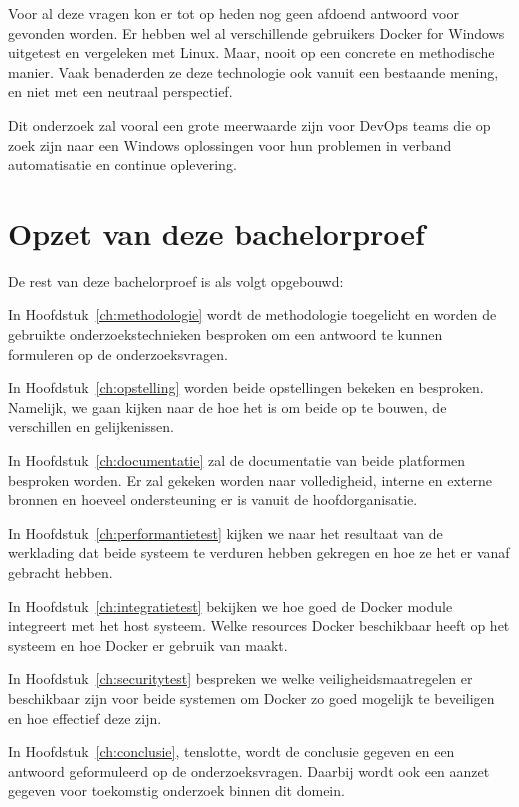 Voor al deze vragen kon er tot op heden nog geen afdoend antwoord voor gevonden worden. Er hebben wel al verschillende gebruikers Docker for Windows uitgetest en vergeleken met Linux. Maar, nooit op een concrete en methodische manier. Vaak benaderden ze deze technologie ook vanuit een bestaande mening, en niet met een neutraal perspectief.


Dit onderzoek zal vooral een grote meerwaarde zijn voor DevOps teams die op zoek zijn naar een Windows oplossingen voor hun problemen in verband automatisatie en continue oplevering.

\section{Opzet van deze bachelorproef}
\label{sec:opzet-bachelorproef}


De rest van deze bachelorproef is als volgt opgebouwd:

In Hoofdstuk~\ref{ch:methodologie} wordt de methodologie toegelicht en worden de gebruikte onderzoekstechnieken besproken om een antwoord te kunnen formuleren op de onderzoeksvragen.


In Hoofdstuk~\ref{ch:opstelling} worden beide opstellingen bekeken en besproken. Namelijk, we gaan kijken naar de hoe het is om beide op te bouwen, de verschillen en gelijkenissen.

In Hoofdstuk~\ref{ch:documentatie} zal de documentatie van beide platformen besproken worden. Er zal gekeken worden naar volledigheid, interne en externe bronnen en hoeveel ondersteuning er is vanuit de hoofdorganisatie.

In Hoofdstuk~\ref{ch:performantietest} kijken we naar het resultaat van de werklading dat beide systeem te verduren hebben gekregen en hoe ze het er vanaf gebracht hebben.

In Hoofdstuk~\ref{ch:integratietest} bekijken we hoe goed de Docker module integreert met het host systeem. Welke resources Docker beschikbaar heeft op het systeem en hoe Docker er gebruik van maakt.

In Hoofdstuk~\ref{ch:securitytest} bespreken we welke veiligheidsmaatregelen er beschikbaar zijn voor beide systemen om Docker zo goed mogelijk te beveiligen en hoe effectief deze zijn.

In Hoofdstuk~\ref{ch:conclusie}, tenslotte, wordt de conclusie gegeven en een antwoord geformuleerd op de onderzoeksvragen. Daarbij wordt ook een aanzet gegeven voor toekomstig onderzoek binnen dit domein.

